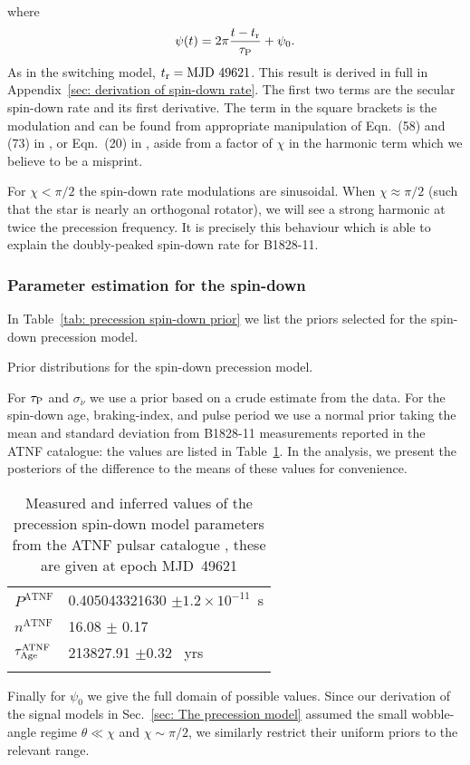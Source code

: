 \documentclass[../full_thesis/full_thesis.tex]{subfiles}
\newcommand{\thisdir}{../comparing_periodic_modulations}
\begin{document}
where
\begin{equation}
\psi(t)= 2\pi\frac{t-t_{\textrm{r}}}{\tau_{\mathrm{P}}} + \psi_{0}.
\end{equation}
As in the switching model, $t_{\textrm{r}}= \textrm{MJD } 49621$.
This result is derived in full in Appendix~\ref{sec: derivation of spin-down rate}.
The first two terms are the secular spin-down rate and its first derivative.
The term in the square brackets is the modulation and can be found from appropriate
manipulation of Eqn.~(58) and (73) in \citet{Jones2001}, or Eqn.~(20) in
\citet{Link2001}, aside from a factor of $\chi$ in the harmonic term which we
believe to be a misprint.

For $\chi < \pi/2$ the spin-down rate modulations are sinusoidal. When $\chi
\approx \pi/2$ (such that the star is nearly an orthogonal rotator), we will
see a strong harmonic at twice the precession frequency. It is precisely this
behaviour which is able to explain the doubly-peaked spin-down rate for
B1828-11.

\subsubsection{Parameter estimation for the spin-down}

In Table~\ref{tab: precession spin-down prior} we list the priors selected for
the spin-down precession model.
\begin{table}
\centering
\caption{Prior distributions for the spin-down precession model.}
\label{tab: precession spin-down prior}

\end{table}
For $\tau_{\mathrm{P}}$ and
$\sigma_{\dot{\nu}}$ we use a prior based on a crude estimate from the data.
For the spin-down age, braking-index, and pulse period we use a normal prior
taking the mean and standard deviation from B1828-11 measurements reported in the
ATNF catalogue: the values are listed in Table~\ref{tab: ATNF}. In the analysis,
we present the posteriors of the difference to the means of these values for
convenience.
\begin{table}
\centering
\caption{Measured and inferred values of the precession spin-down model parameters
from the ATNF pulsar catalogue \citep{ATNF}, these are given at epoch MJD~49621}
\label{tab: ATNF}
\begin{tabular}{ll} \hline \rule{0pt}{3ex}
$P^{\mathrm{ATNF}}$ & 0.405043321630 $\pm 1.2\times10^{-11}$~s \\
$n^{\mathrm{ATNF}}$ & 16.08 $\pm$ 0.17 \\
$\tau_{\mathrm{Age}}^{\mathrm{ATNF}}$ & 213827.91 $\pm 0.32$~ yrs\\
 \hhline{==}
\end{tabular}
\end{table}
Finally for $\psi_0$ we give the full domain of
possible values. Since our derivation of the signal models in Sec.~\ref{sec:
The precession model} assumed the small wobble-angle regime $\theta \ll \chi$
and $\chi \sim \pi/2$, we similarly restrict their uniform priors to the
relevant range.
\end{document}
